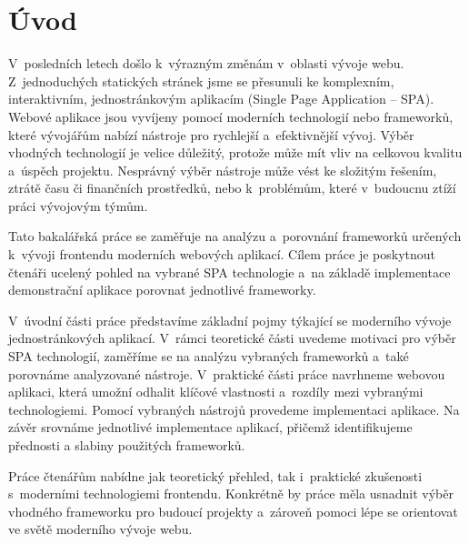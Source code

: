 \section*{Úvod}

V~posledních letech došlo k~výrazným změnám v~oblasti vývoje webu. 
Z~jednoduchých statických stránek jsme se přesunuli ke komplexním, interaktivním, jednostránkovým aplikacím (Single Page Application -- SPA). 
Webové aplikace jsou vyvíjeny pomocí moderních technologií nebo frameworků, které vývojářům nabízí nástroje pro rychlejší a~efektivnější vývoj. 
Výběr vhodných technologií je velice důležitý, protože může mít vliv na celkovou kvalitu a~úspěch projektu. 
Nesprávný výběr nástroje může vést ke složitým řešením, ztrátě času či finančních prostředků, nebo k~problémům, které v~budoucnu ztíží práci vývojovým týmům.

Tato bakalářská práce se zaměřuje na analýzu a~porovnání frameworků určených k~vývoji frontendu moderních webových aplikací. 
Cílem práce je poskytnout čtenáři ucelený pohled na vybrané SPA technologie a~na základě implementace demonstrační aplikace porovnat jednotlivé frameworky.

V~úvodní části práce představíme základní pojmy týkající se moderního vývoje jednostránkových aplikací. 
V~rámci teoretické části uvedeme motivaci pro výběr SPA technologií, zaměříme se na analýzu vybraných frameworků a~také porovnáme analyzované nástroje. 
V~praktické části práce navrhneme webovou aplikaci, která umožní odhalit klíčové vlastnosti a~rozdíly mezi vybranými technologiemi. 
Pomocí vybraných nástrojů provedeme implementaci aplikace. 
Na závěr srovnáme jednotlivé implementace aplikací, přičemž identifikujeme přednosti a slabiny použitých frameworků.

Práce čtenářům nabídne jak teoretický přehled, tak i~praktické zkušenosti s~moderními technologiemi frontendu.
Konkrétně by práce měla usnadnit výběr vhodného frameworku pro budoucí projekty a~zároveň pomoci lépe se orientovat ve světě moderního vývoje webu.


